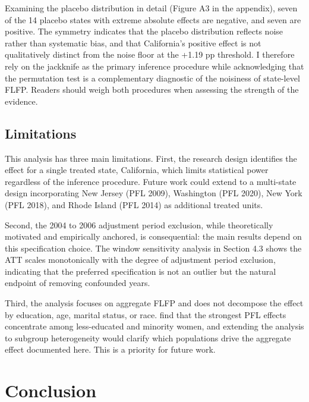 \documentclass[12pt, letterpaper]{article}
\begin{document}
Examining the placebo distribution in detail (Figure A3 in the appendix), seven of the 14 placebo states with extreme absolute effects are negative, and seven are positive. The symmetry indicates that the placebo distribution reflects noise rather than systematic bias, and that California's positive effect is not qualitatively distinct from the noise floor at the +1.19 pp threshold. I therefore rely on the jackknife as the primary inference procedure while acknowledging that the permutation test is a complementary diagnostic of the noisiness of state-level FLFP. Readers should weigh both procedures when assessing the strength of the evidence.

\subsection{Limitations}

This analysis has three main limitations. First, the research design identifies the effect for a single treated state, California, which limits statistical power regardless of the inference procedure. Future work could extend to a multi-state design incorporating New Jersey (PFL 2009), Washington (PFL 2020), New York (PFL 2018), and Rhode Island (PFL 2014) as additional treated units.

Second, the 2004 to 2006 adjustment period exclusion, while theoretically motivated and empirically anchored, is consequential: the main results depend on this specification choice. The window sensitivity analysis in Section 4.3 shows the ATT scales monotonically with the degree of adjustment period exclusion, indicating that the preferred specification is not an outlier but the natural endpoint of removing confounded years.

Third, the analysis focuses on aggregate FLFP and does not decompose the effect by education, age, marital status, or race. \citet{rossin2013} find that the strongest PFL effects concentrate among less-educated and minority women, and extending the analysis to subgroup heterogeneity would clarify which populations drive the aggregate effect documented here. This is a priority for future work.

\section{Conclusion}
\end{document}
